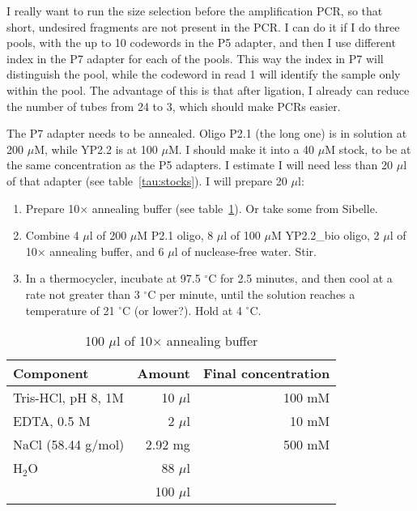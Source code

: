 \documentclass[a4paper,12pt,twosided]{article}
\begin{document}
I really want to run the size selection before the amplification PCR, so that short, undesired fragments are not present in the PCR. I can do it if I do three pools, with the up to 10 codewords in the P5 adapter, and then I use different index in the P7 adapter for each of the pools. This way the index in P7 will distinguish the pool, while the codeword in read 1 will identify the sample only within the pool. The advantage of this is that after ligation, I already can reduce the number of tubes from 24 to 3, which should make PCRs easier.

The P7 adapter needs to be annealed. Oligo P2.1 (the long one) is in solution at 200 $\mu$M, while YP2.2 is at 100 $\mu$M. I should make it into a 40 $\mu$M stock, to be at the same concentration as the P5 adapters. I estimate I will need less than 20 $\mu$l of that adapter (see table~\ref{tau:stocks}). I will prepare 20 $\mu$l:
\begin{enumerate}
   \item Prepare 10$\times$ annealing buffer (see table~\ref{tau:annealingbuffer}). Or take some from Sibelle.
   \item Combine 4 $\mu$l of 200 $\mu$M P2.1 oligo, 8 $\mu$l of 100 $\mu$M YP2.2\_bio oligo, 2 $\mu$l of 10$\times$ annealing buffer, and 6 $\mu$l of nuclease-free water. Stir.
   \item In a thermocycler, incubate at 97.5 $^{\circ}$C for 2.5 minutes, and then cool at a rate not greater than 3 $^{\circ}$C per minute, until the solution reaches a temperature of 21 $^{\circ}$C (or lower?). Hold at 4 $^{\circ}$C.
\end{enumerate}

\begin{table}
\begin{center}
\caption{100 $\mu$l of 10$\times$ annealing buffer}\label{tau:annealingbuffer}
\vspace*{0.2cm}
\begin{tabular}{lrr}
\toprule
Component&Amount&Final concentration\\
\midrule
Tris-HCl, pH 8, 1M&10 $\mu$l&100 mM\\
EDTA, 0.5 M&2 $\mu$l&10 mM\\
NaCl (58.44 g/mol)&2.92 mg&500 mM\\
H$_2$O&88 $\mu$l&\\
\midrule
&100 $\mu$l&\\
\bottomrule
\end{tabular}
\end{center}
\end{table}
\end{document}
